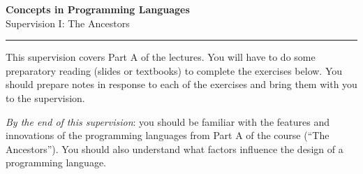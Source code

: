 \documentclass{supervision}
\begin{document}
	
\newcommand{\course}{Concepts in Programming Languages}
\newcommand{\week}{I}
\newcommand{\topics}{}

\begin{center}
\LARGE {\textbf{\color{campurpledark} \course} }\\[-0.2cm]
\Large \color{campurpledark} Supervision \week: The Ancestors\\
\end{center}

{\color{campurple}\hrule}

\newcommand{\terminal}[1]{\texttt{\color{campurple}#1}}
\newcommand{\bl}[1]{{\color{black}#1}}

\vspace{0.5cm}

This supervision covers Part A of the lectures. You will have to do some preparatory reading (slides or textbooks) to complete the exercises below. You should prepare notes in response to each of the exercises and bring them with you to the supervision.

\emph{By the end of this supervision}: you should be familiar with the features and innovations of the programming languages from Part A of the course (``The Ancestors''). You should also understand what factors influence the design of a programming language. 
\end{document}
